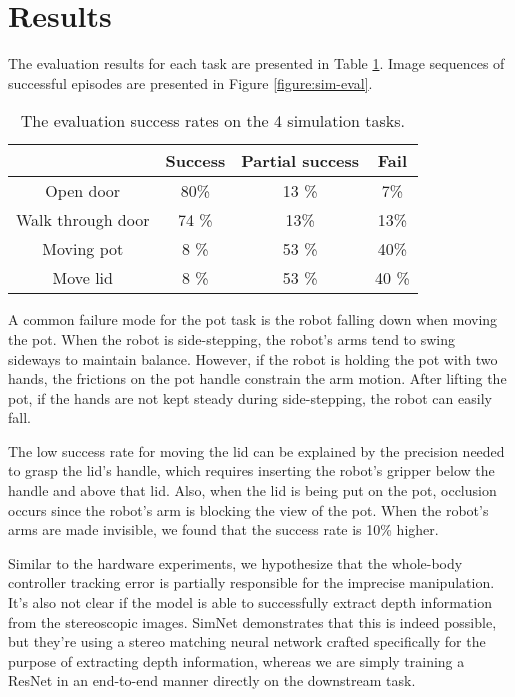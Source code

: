 \section{Results}

The evaluation results for each task are presented in Table \ref{table:results}. Image sequences of successful episodes are presented in Figure \ref{figure:sim-eval}. 

\begin{table}[ht]
	\centering
	\begin{tabular}{|c|c|c|c|}
		\hline
		& Success & Partial success & Fail\\
		\hline
		Open door & 80\% & 13 \% & 7\% \\
		\hline
		Walk through door & 74 \% & 13\% & 13\%\\
		\hline
		Moving pot & 8 \% & 53 \% & 40\%\\
		\hline
		Move lid & 8 \% & 53 \% & 40 \%\\
		\hline
	\end{tabular}
	\caption{The evaluation success rates on the 4 simulation tasks.}
	\label{table:results}
\end{table}

A common failure mode for the pot task is the robot falling down when moving the pot. When the robot is side-stepping, the robot's arms tend to swing sideways to maintain balance. However, if the robot is holding the pot with two hands, the frictions on the pot handle constrain the arm motion. After lifting the pot, if the hands are not kept steady during side-stepping, the robot can easily fall. 

The low success rate for moving the lid can be explained by the precision needed to grasp the lid's handle, which requires inserting the robot's gripper below the handle and above that lid. Also, when the lid is being put on the pot, occlusion occurs since the robot's arm is blocking the view of the pot. When the robot's arms are made invisible, we found that the success rate is 10\% higher. 

Similar to the hardware experiments, we hypothesize that the whole-body controller tracking error is partially responsible for the imprecise manipulation. It's also not clear if the model is able to successfully extract depth information from the stereoscopic images. SimNet \cite{kollar2021simnet} demonstrates that this is indeed possible, but they're using a stereo matching neural network crafted specifically for the purpose of extracting depth information, whereas we are simply training a ResNet in an end-to-end manner directly on the downstream task.

